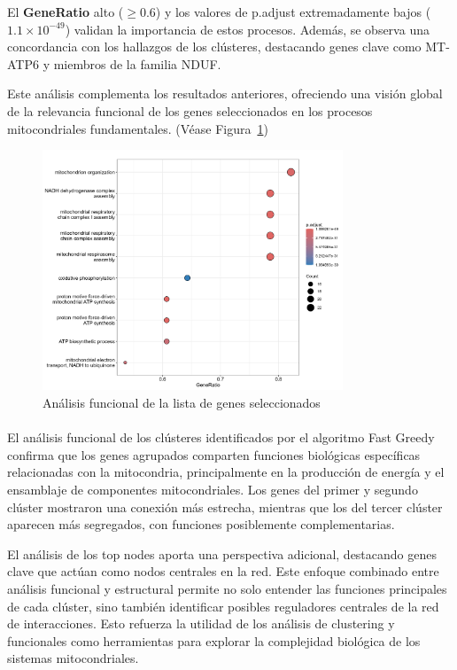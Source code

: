 El \textbf{GeneRatio} alto (\(\geq 0.6\)) y los valores de p.adjust extremadamente bajos (\( 1.1 \times 10^{-49} \)) validan la importancia de estos procesos. Además, se observa una concordancia con los hallazgos de los clústeres, destacando genes clave como MT-ATP6 y miembros de la familia NDUF.

Este análisis complementa los resultados anteriores, ofreciendo una visión global de la relevancia funcional de los genes seleccionados en los procesos mitocondriales fundamentales. (Véase Figura~\ref{fig:imagen3})

\begin{figure}
	\centering
	\includegraphics[width=0.8\textwidth]{figures/func_anal_res_genes_list.png}
	\caption{Análisis funcional de la lista de genes seleccionados}
	\label{fig:imagen3}
\end{figure}

\paragraph{}

El análisis funcional de los clústeres identificados por el algoritmo Fast Greedy confirma que los genes agrupados comparten funciones biológicas específicas relacionadas con la mitocondria, principalmente en la producción de energía y el ensamblaje de componentes mitocondriales. Los genes del primer y segundo clúster mostraron una conexión más estrecha, mientras que los del tercer clúster aparecen más segregados, con funciones posiblemente complementarias.

El análisis de los top nodes aporta una perspectiva adicional, destacando genes clave que actúan como nodos centrales en la red. Este enfoque combinado entre análisis funcional y estructural permite no solo entender las funciones principales de cada clúster, sino también identificar posibles reguladores centrales de la red de interacciones. Esto refuerza la utilidad de los análisis de clustering y funcionales como herramientas para explorar la complejidad biológica de los sistemas mitocondriales.
